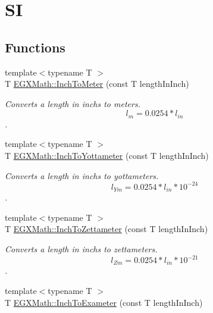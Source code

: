 \hypertarget{group___e_g_x_math-_conversions-_length_conversions-_imperial-_inch-_s_i}{}\section{SI}
\label{group___e_g_x_math-_conversions-_length_conversions-_imperial-_inch-_s_i}
\subsection*{Functions}
\begin{DoxyCompactItemize}
\item 
{\footnotesize template$<$typename T $>$ }\\T \mbox{\hyperlink{group___e_g_x_math-_conversions-_length_conversions-_imperial-_inch-_s_i_ga945abc9740e48bb25302203731967474}{E\+G\+X\+Math\+::\+Inch\+To\+Meter}} (const T length\+In\+Inch)
\begin{DoxyCompactList}\small\item\em Converts a length in inchs to meters. \[ l_{m}=0.0254 * l_{in} \]. \end{DoxyCompactList}\item 
{\footnotesize template$<$typename T $>$ }\\T \mbox{\hyperlink{group___e_g_x_math-_conversions-_length_conversions-_imperial-_inch-_s_i_ga366239d2cec41e7c095c9e73fa4ee7f3}{E\+G\+X\+Math\+::\+Inch\+To\+Yottameter}} (const T length\+In\+Inch)
\begin{DoxyCompactList}\small\item\em Converts a length in inchs to yottameters. \[ l_{Ym}=0.0254 * l_{in} * 10^{-24} \]. \end{DoxyCompactList}\item 
{\footnotesize template$<$typename T $>$ }\\T \mbox{\hyperlink{group___e_g_x_math-_conversions-_length_conversions-_imperial-_inch-_s_i_ga8d295c602a67bb5218b47d7a6c054243}{E\+G\+X\+Math\+::\+Inch\+To\+Zettameter}} (const T length\+In\+Inch)
\begin{DoxyCompactList}\small\item\em Converts a length in inchs to zettameters. \[ l_{Zm}=0.0254 * l_{in} * 10^{-21} \]. \end{DoxyCompactList}\item 
{\footnotesize template$<$typename T $>$ }\\T \mbox{\hyperlink{group___e_g_x_math-_conversions-_length_conversions-_imperial-_inch-_s_i_ga408aa62c2ee50f560f7ffe178ab0f1de}{E\+G\+X\+Math\+::\+Inch\+To\+Exameter}} (const T length\+In\+Inch)

\end{DoxyCompactItemize}
